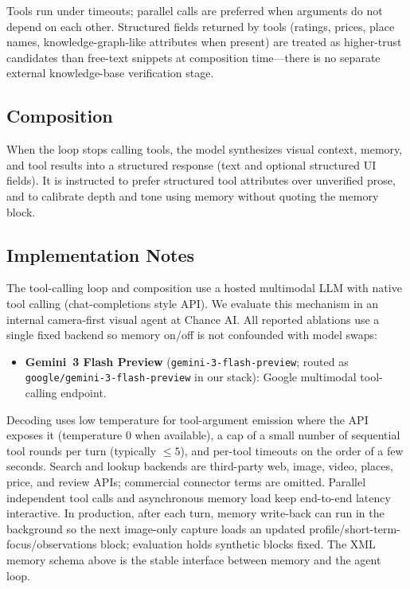 \documentclass[11pt,a4paper]{article}
\begin{document}
Tools run under timeouts; parallel calls are preferred when arguments do not depend on each other. Structured fields returned by tools (ratings, prices, place names, knowledge-graph-like attributes when present) are treated as higher-trust candidates than free-text snippets at composition time---there is no separate external knowledge-base verification stage.

\subsection{Composition}

When the loop stops calling tools, the model synthesizes visual context, memory, and tool results into a structured response (text and optional structured UI fields). It is instructed to prefer structured tool attributes over unverified prose, and to calibrate depth and tone using memory without quoting the memory block.

\subsection{Implementation Notes}

The tool-calling loop and composition use a hosted multimodal LLM with native tool calling (chat-completions style API). We evaluate this mechanism in an internal camera-first visual agent at Chance AI. All reported ablations use a single fixed backend so memory on/off is not confounded with model swaps:
\begin{itemize}[leftmargin=*]
    \item \textbf{Gemini~3 Flash Preview} (\texttt{gemini-3-flash-preview}; routed as \texttt{google/gemini-3-flash-preview} in our stack): Google multimodal tool-calling endpoint.
\end{itemize}
Decoding uses low temperature for tool-argument emission where the API exposes it (temperature $0$ when available), a cap of a small number of sequential tool rounds per turn (typically $\leq 5$), and per-tool timeouts on the order of a few seconds. Search and lookup backends are third-party web, image, video, places, price, and review APIs; commercial connector terms are omitted. Parallel independent tool calls and asynchronous memory load keep end-to-end latency interactive. In production, after each turn, memory write-back can run in the background so the next image-only capture loads an updated profile/short-term-focus/observations block; evaluation holds synthetic blocks fixed. The XML memory schema above is the stable interface between memory and the agent loop.
\end{document}
